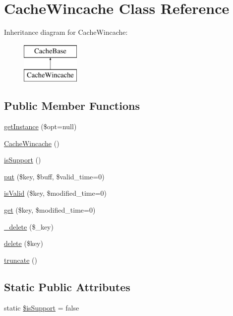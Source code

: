 \hypertarget{classCacheWincache}{}\section{Cache\+Wincache Class Reference}
\label{classCacheWincache}
Inheritance diagram for Cache\+Wincache\+:\begin{figure}[H]
\begin{center}
\leavevmode
\includegraphics[height=2.000000cm]{classCacheWincache}
\end{center}
\end{figure}
\subsection*{Public Member Functions}
\begin{DoxyCompactItemize}
\item 
\hyperlink{classCacheWincache_a4de3bb419825ceebbfbe5374cd144e07}{get\+Instance} (\$opt=null)
\item 
\hyperlink{classCacheWincache_a564e8c74dc22b1e84a0d1cfd6d0d935e}{Cache\+Wincache} ()
\item 
\hyperlink{classCacheWincache_a816994c866a29c5c7b117996de2f513c}{is\+Support} ()
\item 
\hyperlink{classCacheWincache_a1302d9ee0f33efefc8c690a9a9a5f9e1}{put} (\$key, \$buff, \$valid\+\_\+time=0)
\item 
\hyperlink{classCacheWincache_af8d27de13a90149d523c59dc589d2c15}{is\+Valid} (\$key, \$modified\+\_\+time=0)
\item 
\hyperlink{classCacheWincache_a36123121cdf50235b64929c3a13b596b}{get} (\$key, \$modified\+\_\+time=0)
\item 
\hyperlink{classCacheWincache_ab20145a0ee5672f182b6da797c80b77a}{\+\_\+delete} (\$\+\_\+key)
\item 
\hyperlink{classCacheWincache_ae7bfddf70b319e76b50f06d50ec720a2}{delete} (\$key)
\item 
\hyperlink{classCacheWincache_a2da6969290f8ded04554bfaddce5825d}{truncate} ()
\end{DoxyCompactItemize}
\subsection*{Static Public Attributes}
\begin{DoxyCompactItemize}
\item 
static \hyperlink{classCacheWincache_a633cb53cf9535236075169604bf363e3}{\$is\+Support} = false
\end{DoxyCompactItemize}
